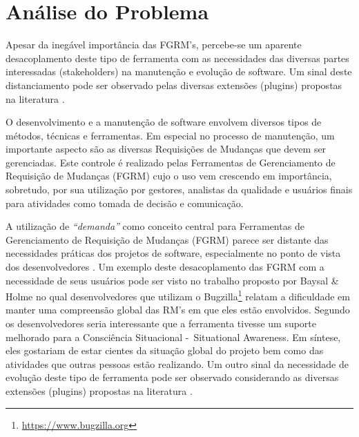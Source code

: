 \section{Análise do Problema}
\label{sec:intro-problema}


Apesar da inegável importância das FGRM's, percebe-se um aparente desacoplamento deste tipo de
ferramenta com as necessidades das diversas partes interessadas (stakeholders) na manutenção e
evolução de software. Um sinal deste distanciamento pode ser observado pelas diversas extensões
(plugins) propostas na literatura
\cite{101186,Thung:2014:BIT:2635868.2661678,Kononenko:2014:DED:2591062.2591075}.
 
O desenvolvimento e a manutenção de software envolvem diversos tipos de métodos, técnicas e
ferramentas. Em especial no processo de manutenção, um importante aspecto são as diversas
Requisições de Mudanças que devem ser gerenciadas. Este controle é realizado pelas Ferramentas de
Gerenciamento de Requisição de Mudanças (FGRM) cujo o uso vem crescendo em importância, sobretudo,
por sua utilização por gestores, analistas da qualidade e usuários finais para atividades como
tomada de decisão e comunicação.

A utilização de  \textit{``demanda''} como conceito central para Ferramentas de Gerenciamento de
Requisição de Mudanças (FGRM) parece ser distante das necessidades práticas dos projetos de
software, especialmente no ponto de vista dos desenvolvedores
\cite{Baysal:2013:SAP:2486788.2486957}. Um exemplo deste desacoplamento das FGRM com a necessidade
de seus usuários pode ser visto no trabalho proposto por Baysal \& Holme
\cite{baysal2012qualitative} no qual desenvolvedores que utilizam o
Bugzilla\footnote{\url{https://www.bugzilla.org}} relatam a dificuldade em manter uma compreensão
global das RM's em que eles estão envolvidos. Segundo os desenvolvedores seria interessante que a
ferramenta tivesse um suporte melhorado para a Consciência Situacional -~Situational Awareness. Em
síntese, eles gostariam de estar cientes da situação global do projeto bem como das atividades que
outras pessoas estão realizando. Um outro sinal da necessidade de evolução deste tipo de ferramenta
pode ser observado considerando as diversas extensões (plugins) propostas na literatura
\cite{101186,Thung:2014:BIT:2635868.2661678,Kononenko:2014:DED:2591062.2591075}.

